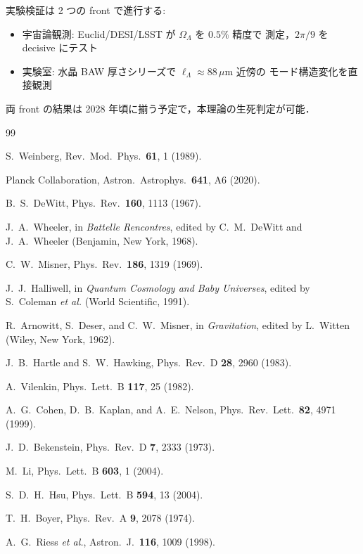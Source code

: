 \documentclass[11pt,a4paper]{article}
\begin{document}
実験検証は 2 つの front で進行する:
\begin{itemize}
\item 宇宙論観測: Euclid/DESI/LSST が $\Omega_\Lambda$ を $0.5\%$ 精度で
測定，$2\pi/9$ を decisive にテスト
\item 実験室: 水晶 BAW 厚さシリーズで $\ell_\Lambda \approx 88\,\mu$m 近傍の
モード構造変化を直接観測
\end{itemize}

両 front の結果は 2028 年頃に揃う予定で，本理論の生死判定が可能．

\begin{thebibliography}{99}

S.~Weinberg, Rev.\ Mod.\ Phys.\ \textbf{61}, 1 (1989).

Planck Collaboration, Astron.\ Astrophys.\ \textbf{641}, A6 (2020).

B.~S.~DeWitt, Phys.\ Rev.\ \textbf{160}, 1113 (1967).

J.~A.~Wheeler, in \textit{Battelle Rencontres}, edited by
C.~M.~DeWitt and J.~A.~Wheeler (Benjamin, New York, 1968).

C.~W.~Misner, Phys.\ Rev.\ \textbf{186}, 1319 (1969).

J.~J.~Halliwell, in \textit{Quantum Cosmology and Baby Universes},
edited by S.~Coleman \textit{et al.} (World Scientific, 1991).

R.~Arnowitt, S.~Deser, and C.~W.~Misner, in \textit{Gravitation},
edited by L.~Witten (Wiley, New York, 1962).

J.~B.~Hartle and S.~W.~Hawking, Phys.\ Rev.\ D \textbf{28}, 2960 (1983).

A.~Vilenkin, Phys.\ Lett.\ B \textbf{117}, 25 (1982).

A.~G.~Cohen, D.~B.~Kaplan, and A.~E.~Nelson,
Phys.\ Rev.\ Lett.\ \textbf{82}, 4971 (1999).

J.~D.~Bekenstein, Phys.\ Rev.\ D \textbf{7}, 2333 (1973).

M.~Li, Phys.\ Lett.\ B \textbf{603}, 1 (2004).

S.~D.~H.~Hsu, Phys.\ Lett.\ B \textbf{594}, 13 (2004).

T.~H.~Boyer, Phys.\ Rev.\ A \textbf{9}, 2078 (1974).

A.~G.~Riess \textit{et al.}, Astron.\ J.\ \textbf{116}, 1009 (1998).


\end{thebibliography}
\end{document}
